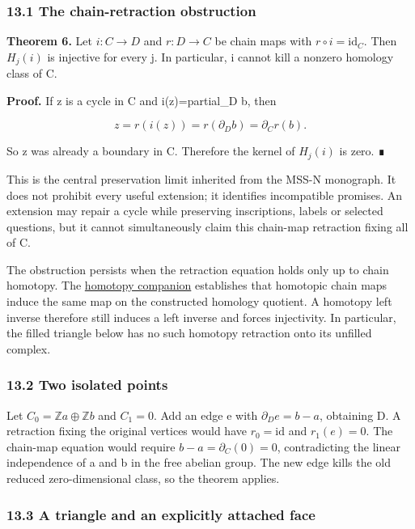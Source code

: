\documentclass[
  11pt,
]{article}
\begin{document}
\subsubsection{13.1 The chain-retraction
obstruction}\label{the-chain-retraction-obstruction}

\textbf{Theorem 6.} Let \(i:C\to D\) and \(r:D\to C\) be chain maps with
\(r\circ i=\mathrm{id}_C\). Then \(H_j(i)\) is injective for every j. In
particular, i cannot kill a nonzero homology class of C.

\textbf{Proof.} If z is a cycle in C and i(z)=partial\_D b, then

\[
z=r(i(z))=r(\partial_D b)=\partial_C r(b).
\]

So z was already a boundary in C. Therefore the kernel of \(H_j(i)\) is
zero. ∎

This is the central preservation limit inherited from the MSS-N
monograph. It does not prohibit every useful extension; it identifies
incompatible promises. An extension may repair a cycle while preserving
inscriptions, labels or selected questions, but it cannot simultaneously
claim this chain-map retraction fixing all of C.

The obstruction persists when the retraction equation holds only up to
chain homotopy. The \href{lean4/ChainHomotopy.lean}{homotopy companion}
establishes that homotopic chain maps induce the same map on the
constructed homology quotient. A homotopy left inverse therefore still
induces a left inverse and forces injectivity. In particular, the filled
triangle below has no such homotopy retraction onto its unfilled
complex.

\subsubsection{13.2 Two isolated points}\label{two-isolated-points}

Let \(C_0=\mathbb Za\oplus\mathbb Zb\) and \(C_1=0\). Add an edge e with
\(\partial_D e=b-a\), obtaining D. A retraction fixing the original
vertices would have \(r_0=\mathrm{id}\) and \(r_1(e)=0\). The chain-map
equation would require \(b-a=\partial_C(0)=0\), contradicting the linear
independence of a and b in the free abelian group. The new edge kills
the old reduced zero-dimensional class, so the theorem applies.

\subsubsection{13.3 A triangle and an explicitly attached
face}\label{a-triangle-and-an-explicitly-attached-face}
\end{document}

